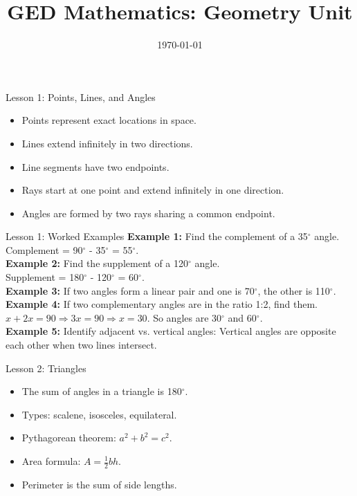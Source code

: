 \documentclass{beamer}
\title{GED Mathematics: Geometry Unit}
\date{\today}
\begin{document}
\frame{\titlepage}

\begin{frame}{Lesson 1: Points, Lines, and Angles}
\begin{itemize}
  \item Points represent exact locations in space.
  \item Lines extend infinitely in two directions.
  \item Line segments have two endpoints.
  \item Rays start at one point and extend infinitely in one direction.
  \item Angles are formed by two rays sharing a common endpoint.
\end{itemize}
\end{frame}

\begin{frame}{Lesson 1: Worked Examples}
\textbf{Example 1:} Find the complement of a 35$^\circ$ angle.\\
Complement = 90$^\circ$ - 35$^\circ$ = 55$^\circ$.\\[1em]
\textbf{Example 2:} Find the supplement of a 120$^\circ$ angle.\\
Supplement = 180$^\circ$ - 120$^\circ$ = 60$^\circ$.\\[1em]
\textbf{Example 3:} If two angles form a linear pair and one is 70$^\circ$, the other is 110$^\circ$.\\[1em]
\textbf{Example 4:} If two complementary angles are in the ratio 1:2, find them.\\
$x + 2x = 90 \Rightarrow 3x = 90 \Rightarrow x = 30$. So angles are 30$^\circ$ and 60$^\circ$.\\[1em]
\textbf{Example 5:} Identify adjacent vs. vertical angles: Vertical angles are opposite each other when two lines intersect.
\end{frame}

\begin{frame}{Lesson 2: Triangles}
\begin{itemize}
  \item The sum of angles in a triangle is 180$^\circ$.
  \item Types: scalene, isosceles, equilateral.
  \item Pythagorean theorem: $a^2 + b^2 = c^2$.
  \item Area formula: $A = \tfrac{1}{2}bh$.
  \item Perimeter is the sum of side lengths.
\end{itemize}
\end{frame}
\end{document}
